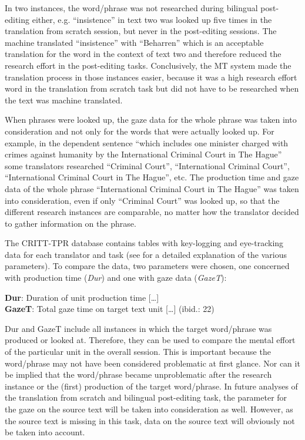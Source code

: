 \documentclass[output=paper]{langsci/langscibook}
\begin{document}
In two instances, the word/phrase was not researched during bilingual post-editing either, e.g. ``insistence'' in text two was looked up five times in the translation from scratch session, but never in the post-editing sessions. The machine translated ``insistence'' with ``Beharren'' which is an acceptable translation for the word in the context of text two and therefore reduced the research effort in the post-editing tasks. Conclusively, the MT system made the translation process in those instances easier, because it was a high research effort word in the translation from scratch task but did not have to be researched when the text was machine translated.



When phrases were looked up, the gaze data for the whole phrase was taken into consideration and not only for the words that were actually looked up. For example, in the dependent sentence ``which includes one minister charged with crimes against humanity by the International Criminal Court in The Hague'' some translators researched ``Criminal Court'', ``International Criminal Court'', ``International Criminal Court in The Hague'', etc. The production time and gaze data of the whole phrase ``International Criminal Court in The Hague'' was taken into consideration, even if only ``Criminal Court'' was looked up, so that the different research instances are comparable, no matter how the translator decided to gather information on the phrase.



The CRITT-TPR database contains tables with key-logging and eye-tracking data for each translator and task (see \citealt{carl2013} for a detailed explanation of the various parameters). To compare the data, two parameters were chosen, one concerned with production time (\textit{Dur}) and one with gaze data (\textit{GazeT}):

\ea
 \textbf{Dur}: Duration of unit production time [\ldots]\\
  \textbf{GazeT}: Total gaze time on target text unit [\ldots] (ibid.: 22) 
\z

Dur and GazeT include all instances in which the target word/phrase was produced or looked at. Therefore, they can be used to compare the mental effort of the particular unit in the overall session. This is important because the word/phrase may not have been considered problematic at first glance. Nor can it be implied that the word/phrase became unproblematic after the research instance or the (first) production of the target word/phrase. In future analyses of the translation from scratch and bilingual post-editing task, the parameter for the gaze on the source text will be taken into consideration as well. However, as the source text is missing in this task, data on the source text will obviously not be taken into account.
\end{document}
